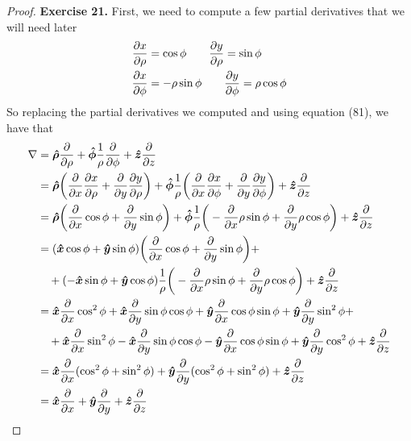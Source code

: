 \documentclass[11pt]{article}
\newcommand{\hatx}{\bm{\hat{x}}}
\newcommand{\haty}{\bm{\hat{y}}}
\newcommand{\hatz}{\bm{\hat{z}}}
\newcommand{\hatrho}{\bm{\hat{\rho}}}
\newcommand{\hatphi}{\bm{\hat{\phi}}}
\theoremstyle{definition}
\begin{document}
\begin{proof}{\textbf{Exercise 21.}}
    First, we need to compute a few partial derivatives that we will need later
    \begin{align*}
        \partialderivative{x}{\rho} &= \cos\phi\quad\quad
        \partialderivative{y}{\rho} = \sin\phi\\
        \partialderivative{x}{\phi} &= -\rho\sin\phi\quad\quad
        \partialderivative{y}{\phi} = \rho\cos\phi
    \end{align*}
    So replacing the partial derivatives we computed and using equation (81),
    we have that
    \begin{align*}
        \nabla &= \hatrho \partialderivative{}{\rho}
        + \hatphi \frac{1}{\rho}\partialderivative{}{\phi}
        + \hatz\partialderivative{}{z}\\
        &= \hatrho \bigg(\partialderivative{}{x}\partialderivative{x}{\rho}
        + \partialderivative{}{y}\partialderivative{y}{\rho}\bigg)
        + \hatphi\frac{1}{\rho}\bigg(
            \partialderivative{}{x}\partialderivative{x}{\phi}
            + \partialderivative{}{y}\partialderivative{y}{\phi}\bigg)
        + \hatz\partialderivative{}{z}\\
        &= \hatrho \bigg(\partialderivative{}{x}\cos\phi
        + \partialderivative{}{y}\sin\phi\bigg)
        + \hatphi\frac{1}{\rho}\bigg(
            -\partialderivative{}{x}\rho\sin\phi
            + \partialderivative{}{y}\rho\cos\phi\bigg)
        + \hatz\partialderivative{}{z}\\
        &= (\hatx\cos\phi + \haty\sin\phi)\bigg(\partialderivative{}{x}\cos\phi
        + \partialderivative{}{y}\sin\phi\bigg) +\\
        &\quad+ (-\hatx\sin\phi + \haty\cos\phi)\frac{1}{\rho}\bigg(
            -\partialderivative{}{x}\rho\sin\phi
            + \partialderivative{}{y}\rho\cos\phi\bigg)
        + \hatz\partialderivative{}{z}\\
        &= \hatx\partialderivative{}{x}\cos^2\phi
        + \hatx\partialderivative{}{y}\sin\phi\cos\phi
        + \haty\partialderivative{}{x}\cos\phi\sin\phi
        + \haty\partialderivative{}{y}\sin^2\phi + \\
        &\quad
        + \hatx\partialderivative{}{x}\sin^2\phi
        - \hatx\partialderivative{}{y}\sin\phi\cos\phi
        - \haty\partialderivative{}{x}\cos\phi\sin\phi
        + \haty\partialderivative{}{y}\cos^2\phi
        + \hatz\partialderivative{}{z}\\
        &= \hatx\frac{\partial}{\partial x}(\cos^2\phi + \sin^2\phi)
        + \haty\frac{\partial}{\partial y}(\cos^2\phi + \sin^2\phi)
        + \hatz\partialderivative{}{z}\\
        &= \hatx\frac{\partial}{\partial x} + \haty\frac{\partial}{\partial y}
        + \hatz\partialderivative{}{z}
    \end{align*}
\end{proof}
\end{document}
